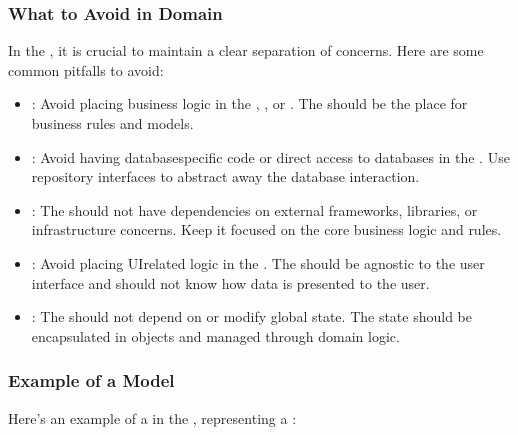 \documentclass[letterpaper,10pt,english]{sphinxhowto}
\begin{document}
\subsubsection{What to Avoid in Domain}
\label{\detokenize{architecture/domain/index:what-to-avoid-in-domain}}
\sphinxAtStartPar
In the , it is crucial to maintain a clear separation of concerns. Here are some common pitfalls to avoid:
\begin{itemize}
\item {} 
\sphinxAtStartPar
{}: Avoid placing business logic in the , , or . The  should be the place for business rules and models.

\item {} 
\sphinxAtStartPar
{}: Avoid having database\sphinxhyphen{}specific code or direct access to databases in the . Use repository interfaces to abstract away the database interaction.

\item {} 
\sphinxAtStartPar
{}: The  should not have dependencies on external frameworks, libraries, or infrastructure concerns. Keep it focused on the core business logic and rules.

\item {} 
\sphinxAtStartPar
{}: Avoid placing UI\sphinxhyphen{}related logic in the . The  should be agnostic to the user interface and should not know how data is presented to the user.

\item {} 
\sphinxAtStartPar
{}: The  should not depend on or modify global state. The state should be encapsulated in objects and managed through domain logic.

\end{itemize}


\subsubsection{Example of a Model}
\label{\detokenize{architecture/domain/index:example-of-a-model}}
\sphinxAtStartPar
Here’s an example of a  in the , representing a :
\end{document}
